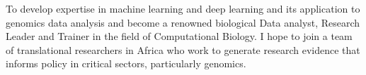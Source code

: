 

\begin{cvparagraph}

To develop expertise in machine learning and deep learning and its application to genomics data analysis and become a renowned biological  Data analyst, Research Leader and Trainer in the field of Computational Biology. I hope to join a team of translational researchers in Africa who work to generate research evidence that informs policy in critical sectors, particularly genomics.

\end{cvparagraph}
